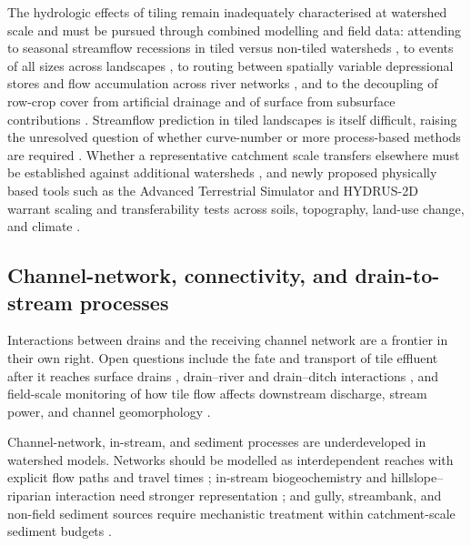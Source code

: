 The hydrologic effects of tiling remain inadequately characterised at watershed
scale and must be pursued through combined modelling and field data: attending
to seasonal streamflow recessions in tiled versus non-tiled watersheds
\parencite{Schilling2008,Schilling2012}, to events of all sizes across
landscapes \parencite{Sloan2017}, to routing between spatially variable
depressional stores and flow accumulation across river networks
\parencite{Sloan2016,Fonley2021}, and to the decoupling of row-crop cover from
artificial drainage and of surface from subsurface contributions
\parencite{BolandBrien2014}. Streamflow prediction in tiled landscapes is
itself difficult, raising the unresolved question of whether curve-number or
more process-based methods are required
\parencite{Wessel2022,Thomas2016,Rahman2014}. Whether a representative
catchment scale transfers elsewhere must be established against additional
watersheds \parencite{Basu2010,Thomas2016}, and newly proposed physically based
tools such as the Advanced Terrestrial Simulator and HYDRUS-2D warrant scaling
and transferability tests across soils, topography, land-use change, and
climate \parencite{Rathore2025,Naderi2025,Basu2010}.

\subsection{Channel-network, connectivity, and drain-to-stream processes}

Interactions between drains and the receiving channel network are a frontier in
their own right. Open questions include the fate and transport of tile effluent
after it reaches surface drains \parencite{Clement2017}, drain--river and
drain--ditch interactions \parencite{Grangeon2021}, and field-scale monitoring
of how tile flow affects downstream discharge, stream power, and channel
geomorphology \parencite{Zhou2025,Zhou2013}.

Channel-network, in-stream, and sediment processes are underdeveloped in
watershed models. Networks should be modelled as interdependent reaches with
explicit flow paths and travel times \parencite{Giraud1997,Williamson2025};
in-stream biogeochemistry and hillslope--riparian interaction need stronger
representation \parencite{Schilling2012b,Basu2010}; and gully, streambank, and
non-field sediment sources require mechanistic treatment within catchment-scale
sediment budgets \parencite{Maalim2013,Dalzell2018,Walling2002}.

